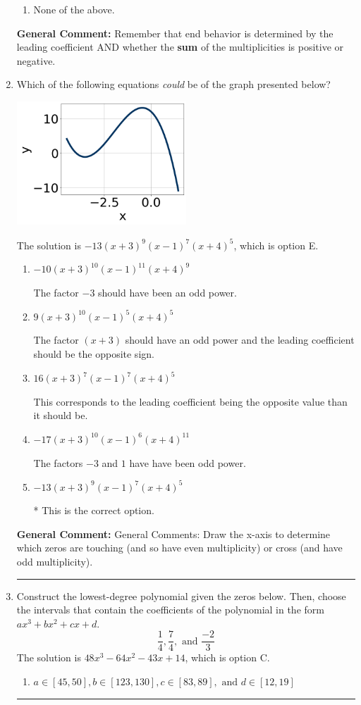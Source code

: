 \documentclass{extbook}[14pt]
\newcommand{\litem}[1]{\item #1

\rule{\textwidth}{0.4pt}}
\begin{document}
\begin{enumerate}
{\begin{enumerate}[label=\Alph*.]
\begin{multicols}{2}
\end{multicols}\item None of the above.\end{enumerate}
\textbf{General Comment:} Remember that end behavior is determined by the leading coefficient AND whether the \textbf{sum} of the multiplicities is positive or negative.
}
\litem{
Which of the following equations \textit{could} be of the graph presented below?

\begin{center}
    \includegraphics[width=0.5\textwidth]{../Figures/polyGraphToFunctionCopyC.png}
\end{center}


The solution is \( -13(x + 3)^{9} (x - 1)^{7} (x + 4)^{5} \), which is option E.\begin{enumerate}[label=\Alph*.]
\item \( -10(x + 3)^{10} (x - 1)^{11} (x + 4)^{9} \)

The factor $-3$ should have been an odd power.
\item \( 9(x + 3)^{10} (x - 1)^{5} (x + 4)^{5} \)

The factor $(x + 3)$ should have an odd power and the leading coefficient should be the opposite sign.
\item \( 16(x + 3)^{7} (x - 1)^{7} (x + 4)^{5} \)

This corresponds to the leading coefficient being the opposite value than it should be.
\item \( -17(x + 3)^{10} (x - 1)^{6} (x + 4)^{11} \)

The factors $-3$ and $1$ have have been odd power.
\item \( -13(x + 3)^{9} (x - 1)^{7} (x + 4)^{5} \)

* This is the correct option.
\end{enumerate}

\textbf{General Comment:} General Comments: Draw the x-axis to determine which zeros are touching (and so have even multiplicity) or cross (and have odd multiplicity).
}
\litem{
Construct the lowest-degree polynomial given the zeros below. Then, choose the intervals that contain the coefficients of the polynomial in the form $ax^3+bx^2+cx+d$.
\[ \frac{1}{4}, \frac{7}{4}, \text{ and } \frac{-2}{3} \]The solution is \( 48x^{3} -64 x^{2} -43 x + 14 \), which is option C.\begin{enumerate}[label=\Alph*.]
\item \( a \in [45, 50], b \in [123, 130], c \in [83, 89], \text{ and } d \in [12, 19] \)


\end{enumerate}}
\end{enumerate}
\end{document}
